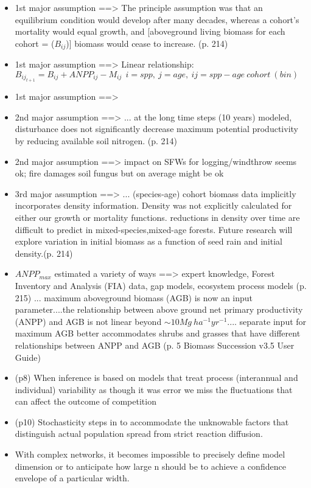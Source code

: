 \documentclass[twoside]{article}	                         %
\begin{document}
\begin{itemize}
  \item 1st major assumption ==> The principle assumption was that an equilibrium condition would develop after many decades, whereas a cohort's mortality would equal growth, and [aboveground living biomass for each cohort = ($B_{ij}$)] biomass would cease to increase. (p. 214) 
  \item 1st major assumption ==> Linear relationship: $B_{ij_{t+1}} = B_{ij} + ANPP_{ij} - M_{ij} \ \ i = spp ,\ j= age, \ ij=spp-age \ cohort \ (bin) $
  \item 1st major assumption ==> 
  \item 2nd major assumption ==> ... at the long time steps (10 years) modeled, disturbance does not significantly decrease maximum potential productivity by reducing available soil nitrogen. (p. 214)
  \item 2nd major assumption ==> impact on SFWs for logging/windthrow seems ok; fire damages soil fungus but on average might be ok
  \item 3rd major assumption ==> ... (species-age) cohort biomass data implicitly incorporates density information. Density was not explicitly calculated for either our growth or mortality functions. reductions in density over time are difficult to predict in mixed-species,mixed-age forests. Future research will explore variation in initial biomass as a function of seed rain and initial density.(p. 214)
  \item $ANPP_{max}$ estimated a variety of ways ==> expert knowledge, Forest Inventory and Analysis (FIA) data, gap models, ecosystem process models (p. 215) ... maximum aboveground biomass (AGB) is now an input parameter....the relationship between above ground net primary productivity (ANPP) and AGB is not linear beyond $\sim 10 Mg \ ha^{-1} yr^{-1}$.... separate input for maximum AGB better accommodates shrubs and grasses that have different relationships between ANPP and AGB (p. 5 Biomass Succession v3.5 User Guide)
  \item (p8) When inference is based on models that treat process (interannual and individual) variability as though it was error we miss the fluctuations that can affect the outcome of competition
  \item (p10) Stochasticity steps in to accommodate the unknowable factors that distinguish actual population spread from strict reaction diffusion.
  \item With complex networks, it becomes impossible to precisely define model dimension or to anticipate how large n should be to achieve a confidence envelope of a particular width.

\end{itemize}
\end{document}
